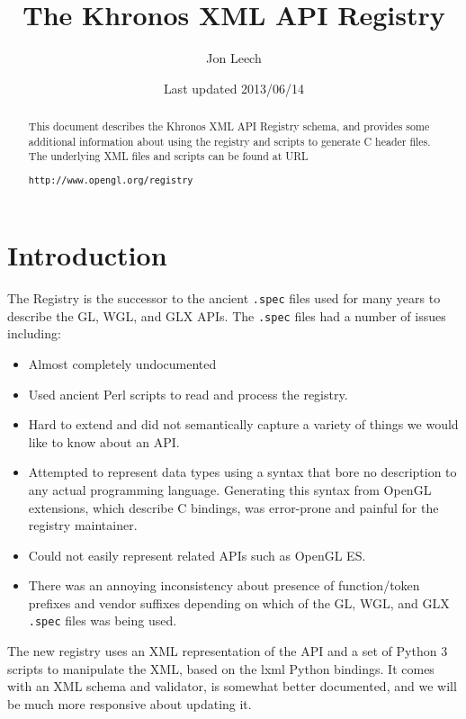 \documentclass{article}
\def\code#1{{\tt #1}}
\begin{document}
\title{The Khronos XML API Registry}
\author{Jon Leech}
\date{Last updated 2013/06/14}
\maketitle

\begin{abstract}

This document describes the Khronos XML API Registry schema, and
provides some additional information about using the registry and
scripts to generate C header files. The underlying XML files and
scripts can be found at URL

\begin{center}
{\tt http://www.opengl.org/registry}
\end{center}

\end{abstract}

\tableofcontents

\section{Introduction}

The Registry is the successor to the ancient \code{.spec} files used for
many years to describe the GL, WGL, and GLX APIs. The \code{.spec} files
had a number of issues including:

\begin{itemize}
\item Almost completely undocumented
\item Used ancient Perl scripts to read and process the registry.
\item Hard to extend and did not semantically capture a variety of
      things we would like to know about an API.
\item Attempted to represent data types using a syntax that bore no
      description to any actual programming language. Generating this
      syntax from OpenGL extensions, which describe C bindings, was
      error-prone and painful for the registry maintainer.
\item Could not easily represent related APIs such as OpenGL ES.
\item There was an annoying inconsistency about presence of
      function/token prefixes and vendor suffixes depending on which of
      the GL, WGL, and GLX \code{.spec} files was being used.
\end{itemize}

The new registry uses an XML representation of the API and a set of
Python 3 scripts to manipulate the XML, based on the lxml Python
bindings. It comes with an XML schema and validator, is somewhat better
documented, and we will be much more responsive about updating it.
\end{document}
